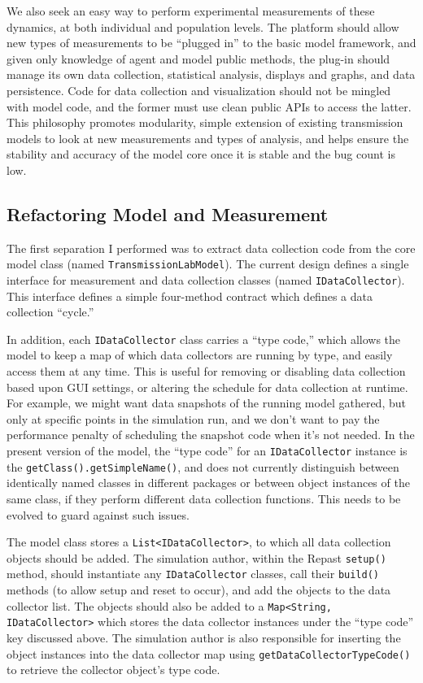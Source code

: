 \documentclass{kluwer-mem-copyright}
\begin{document}
\begin{article}
We also seek an easy way to perform experimental measurements of these dynamics,
at both individual and population levels.  The platform should allow new types
of measurements to be ``plugged in'' to the basic model framework, and given
only knowledge of agent and model public methods, the plug-in should manage its
own data collection, statistical analysis, displays and graphs, and data
persistence.  Code for data collection and visualization should not be mingled
with model code, and the former must use clean public APIs to access the latter.
This philosophy promotes modularity, simple extension of existing transmission
models to look at new measurements and types of analysis, and helps ensure the
stability and accuracy of the model core once it is stable and the bug count is
low. 
\subsection{Refactoring Model and Measurement}
The first separation I performed was to extract data collection code from
the core model class (named \texttt{TransmissionLabModel}).  The current design
defines a single interface for measurement and data collection classes (named
\texttt{IDataCollector}).  This interface defines a simple four-method contract
which defines a data collection ``cycle.''  

In addition, each \texttt{IDataCollector} class carries a ``type code,'' which
allows the model to keep a map of which data collectors are running by type, and
easily access them at any time.  This is useful for removing or disabling data
collection based upon GUI settings, or altering the schedule for data collection
at runtime.  For example, we might want data snapshots of the running model
gathered, but only at specific points in the simulation run, and we don't want
to pay the performance penalty of scheduling the snapshot code when it's not
needed.  In the present version of the model, the ``type code'' for an
\texttt{IDataCollector} instance is the \texttt{getClass().getSimpleName()}, and
does not currently distinguish between identically named classes in different
packages or between object instances of the same class, if they perform
different data collection functions.  This needs to be evolved to guard against
such issues.

The model class stores a 
\texttt{List<IDataCollector>}, to which all data collection objects should be
added.  The simulation author, within the Repast \texttt{setup()} method, 
should instantiate any \texttt{IDataCollector} classes, call
their \texttt{build()} methods (to allow setup and reset to occur), and add the
objects to the data collector list.  The objects should also be added to a
\texttt{Map<String, IDataCollector>} which stores the data collector instances
under the ``type code'' key discussed above.  The simulation author is also
responsible for inserting the object instances into the data collector map using
\texttt{getDataCollectorTypeCode()} to retrieve the collector object's type code. 


\end{article}
\end{document}
